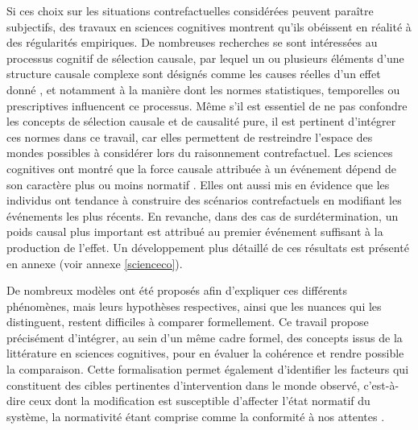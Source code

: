 Si ces choix sur les situations contrefactuelles considérées peuvent paraître subjectifs, des travaux en sciences cognitives montrent qu'ils obéissent en réalité à des régularités empiriques. De nombreuses recherches se sont intéressées au processus cognitif de sélection causale, par lequel un ou plusieurs éléments d'une structure causale complexe sont désignés comme les causes réelles d'un effet donné \parencite{reuter_good_2014}, et notamment à la manière dont les normes statistiques, temporelles ou prescriptives influencent ce processus. Même s'il est essentiel de ne pas confondre les concepts de sélection causale et de causalité pure, il est pertinent d'intégrer ces normes dans ce travail, car elles permettent de restreindre l'espace des mondes possibles à considérer lors du raisonnement contrefactuel. Les sciences cognitives ont montré que la force causale attribuée à un événement dépend de son caractère plus ou moins normatif \parencite{icard_normality_2017}. Elles ont aussi mis en évidence que les individus ont tendance à construire des scénarios contrefactuels en modifiant les événements les plus récents. En revanche, dans des cas de surdétermination, un poids causal plus important est attribué au premier événement suffisant à la production de l'effet. Un développement plus détaillé de ces résultats est présenté en annexe (voir annexe \ref{scienceco}).

De nombreux modèles ont été proposés afin d'expliquer ces différents phénomènes, mais leurs hypothèses respectives, ainsi que les nuances qui les distinguent, restent difficiles à comparer formellement. Ce travail propose précisément d'intégrer, au sein d'un même cadre formel, des concepts issus de la littérature en sciences cognitives, pour en évaluer la cohérence et rendre possible la comparaison. Cette formalisation permet également d'identifier les facteurs qui constituent des cibles pertinentes d'intervention dans le monde observé, c'est-à-dire ceux dont la modification est susceptible d'affecter l'état normatif du système, la normativité étant comprise comme la conformité à nos attentes \parencite{damico_interventionist_nodate}.




